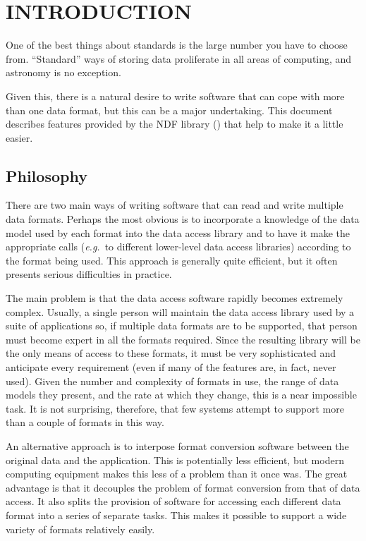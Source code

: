 \documentclass[11pt,twoside,nolof]{starlink}
\providecommand{\st}[1]{{\em{#1}}}
\begin{document}
\scfrontmatter

\section{INTRODUCTION}

One of the best things about standards is the large number you have to
choose from. ``Standard'' ways of storing data proliferate in all
areas of computing, and astronomy is no exception.

Given this, there is a natural desire to write software that can cope
with more than one data format, but this can be a major undertaking.
This document describes features provided by the NDF library
() that help to make it a little easier.

\subsection{Philosophy}

There are two main ways of writing software that can read and write
multiple data formats. Perhaps the most obvious is to incorporate a
knowledge of the data model used by each format into the data access
library and to have it make the appropriate calls (\st{e.g.}\ to
different lower-level data access libraries) according to the format
being used. This approach is generally quite efficient, but it often
presents serious difficulties in practice.

The main problem is that the data access software rapidly becomes
extremely complex.  Usually, a single person will maintain the data
access library used by a suite of applications so, if multiple data
formats are to be supported, that person must become expert in all the
formats required. Since the resulting library will be the only means
of access to these formats, it must be very sophisticated and
anticipate every requirement (even if many of the features are, in
fact, never used). Given the number and complexity of formats in use,
the range of data models they present, and the rate at which they
change, this is a near impossible task. It is not surprising,
therefore, that few systems attempt to support more than a couple of
formats in this way.

An alternative approach is to interpose format conversion software
between the original data and the application. This is potentially
less efficient, but modern computing equipment makes this less of a
problem than it once was. The great advantage is that it decouples the
problem of format conversion from that of data access. It also splits
the provision of software for accessing each different data format
into a series of separate tasks.  This makes it possible to support a
wide variety of formats relatively easily.
\end{document}
